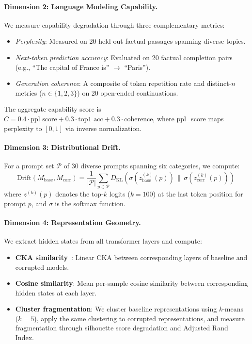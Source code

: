 \documentclass[conference]{IEEEtran}
\newcommand{\dkl}{D_{\mathrm{KL}}}
\begin{document}
\paragraph{Dimension 2: Language Modeling Capability.}
We measure capability degradation through three complementary metrics:
\begin{itemize}
    \item \emph{Perplexity}: Measured on 20 held-out factual passages spanning diverse topics.
    \item \emph{Next-token prediction accuracy}: Evaluated on 20 factual completion pairs (e.g., ``The capital of France is'' $\to$ ``Paris'').
    \item \emph{Generation coherence}: A composite of token repetition rate and distinct-$n$ metrics ($n \in \{1,2,3\}$) on 20 open-ended continuations.
\end{itemize}
The aggregate capability score is $C = 0.4 \cdot \text{ppl\_score} + 0.3 \cdot \text{top1\_acc} + 0.3 \cdot \text{coherence}$, where ppl\_score maps perplexity to $[0,1]$ via inverse normalization.

\paragraph{Dimension 3: Distributional Drift.}
For a prompt set $\mathcal{P}$ of 30 diverse prompts spanning six categories, we compute:
\begin{equation}
    \text{Drift}(M_{\text{base}}, M_{\text{corr}}) = \frac{1}{|\mathcal{P}|} \sum_{p \in \mathcal{P}} \dkl\!\left(\sigma(z^{(k)}_{\text{base}}(p)) \,\|\, \sigma(z^{(k)}_{\text{corr}}(p))\right)
    \label{eq:drift}
\end{equation}
where $z^{(k)}(p)$ denotes the top-$k$ logits ($k{=}100$) at the last token position for prompt $p$, and $\sigma$ is the softmax function.

\paragraph{Dimension 4: Representation Geometry.}
We extract hidden states from all transformer layers and compute:
\begin{itemize}
    \item \textbf{CKA similarity}~\cite{kornblith2019similarity}: Linear CKA between corresponding layers of baseline and corrupted models.
    \item \textbf{Cosine similarity}: Mean per-sample cosine similarity between corresponding hidden states at each layer.
    \item \textbf{Cluster fragmentation}: We cluster baseline representations using $k$-means ($k{=}5$), apply the same clustering to corrupted representations, and measure fragmentation through silhouette score degradation and Adjusted Rand Index.
\end{itemize}
\end{document}
